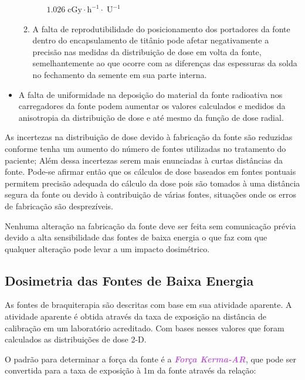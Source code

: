 \documentclass[11pt,a4paper]{article}
\begin{document}
\begin{itemize}[label=\textcolor{CarnationPink}{$\blacktriangleright$}]
\begin{enumerate}
\begin{itemize}
											\textbf{$\mathrm{1.026 \; cGy \cdot h^{-1} \cdot \; U^{-1}}$}
									\end{itemize}

							\item A falta de reprodutibilidade do posicionamento dos portadores da fonte dentro do encapsulamento de titânio pode afetar negativamente a precisão nas medidas da distribuição de dose em volta da fonte, semelhantemente ao que ocorre com as diferenças das espessuras da solda no fechamento da semente em sua parte interna.
							
						\end{enumerate}
					
					\item A falta de uniformidade na deposição do material da fonte radioativa nos carregadores da fonte podem aumentar os valores calculados e medidos da anisotropia da distribuição de dose e até mesmo da função de dose radial.
					
				\end{itemize}

			As incertezas na distribuição de dose devido à fabricação da fonte são reduzidas conforme tenha um aumento do número de fontes utilizadas no tratamento do paciente; Além dessa incertezas serem mais enunciadas à curtas distâncias da fonte. Pode-se afirmar então que os cálculos de dose baseados em fontes pontuais permitem precisão adequada do cálculo da dose pois são tomados à uma distância segura da fonte ou devido à contribuição de várias fontes, situações onde os erros de fabricação são desprezíveis.

			Nenhuma alteração na fabricação da fonte deve ser feita sem comunicação prévia devido a alta sensibilidade das fontes de baixa energia o que faz com que qualquer alteração pode levar a um impacto dosimétrico.

\subsection*{Dosimetria das Fontes de Baixa Energia}

			As fontes de braquiterapia são descritas com base em sua atividade aparente. A atividade aparente é obtida através da taxa de exposição na distância de calibração em um laboratório acreditado. Com bases nesses valores que foram calculados as distribuições de dose 2-D.

			O padrão para determinar a força da fonte é a \textit{\textbf{\textcolor{MediumOrchid}{Força Kerma-AR}}}, que pode ser convertida para a taxa de exposição à 1m da fonte através da relação:
\end{document}

